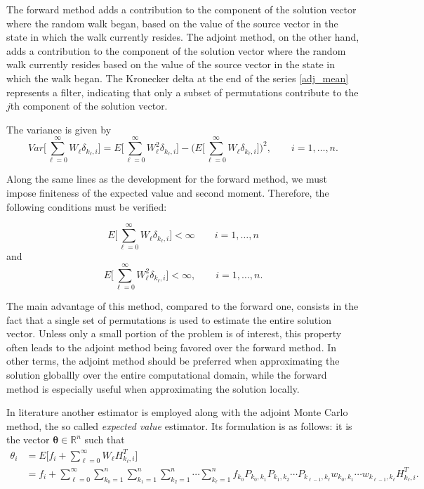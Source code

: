 \documentclass[final,leqno,onefignum,onetabnum]{siamltex1213}
\begin{document}
The forward method adds a contribution to the component of the solution
vector where the random walk began, based on the value of the source vector
in the state in which the walk currently resides.  The adjoint method,
on the other hand, adds a contribution to the component of the solution
vector where the random walk currently resides based on the value of the
source vector in the state in which the walk began.
The Kronecker delta at the end of the series \eqref{adj_mean} represents a
filter, indicating
that only a subset of permutations contribute to the $j$th component
of the solution vector.

The variance is given by
\begin{equation}
Var\bigg [\sum_{\ell=0}^\infty W_{\ell}
\delta_{k_{\ell},i}\bigg]=E\bigg[\sum_{\ell=0}^\infty W_{\ell}^2
\delta_{k_{\ell},i}\bigg ] - \bigg
(E\bigg[\sum_{\ell=0}^\infty
W_{\ell}
\delta_{k_{\ell},i}\bigg]\bigg )^2, \qquad i=1,\ldots,n
\label{adj_var}.
\end{equation}

Along the same lines as the development for the forward method, we must
impose finiteness of the expected value and second moment.
Therefore, the following
conditions must be verified:

\begin{equation}
 E\bigg[\sum_{\ell=0}^\infty W_{\ell}\delta_{k_{\ell},
i}\bigg]<\infty \qquad i=1,\ldots,n
\end{equation}
and
\begin{equation}
 E\bigg[\sum_{\ell=0}^\infty W_{\ell}^2
\delta_{k_{\ell},i}\bigg]<\infty, \qquad i=1,\ldots,n.
\end{equation}

The main advantage of this method, compared to the forward one, consists in the
fact that a single set of permutations is used to estimate the entire solution
vector.  Unless only a small portion of the problem is of interest, this
property often leads to the adjoint method being favored over the forward
method.
 In other terms, the adjoint method should be preferred when approximating
the solution globallly over the entire computational domain, while the forward
method is especially useful when approximating the solution locally.

In literature another estimator is employed along with the adjoint Monte Carlo
method, the so called \textit{expected value} estimator. Its
formulation is as follows: it is the vector
$\boldsymbol{\theta}\in \mathbb{R}^n$ such that
\begin{equation}
\begin{array}{rl}
\theta_i & =E\bigg[f_i + \sum_{\ell=0}^\infty
W_{\ell}H_{k_{\ell}, i}^T\bigg]\\
&=f_i
+{\displaystyle \sum_{\ell=0}^{\infty}\sum_{k_0=1}^n\sum_{k_1=1}^n\sum_{k_2=1} ^n\cdots\sum_
{ k_ { \ell}=1}^n
f_{k_0}P_{k_0,k_1}P_{k_1,k_2}\cdots
P_{k_{\ell-1},k_{\ell}}w_{k_0,k_1}\cdots
w_{k_{\ell-1},k_{\ell}}H_{k_{\ell},i}^T.}
\label{adj_mean1}
\end{array}
\end{equation}
\end{document}
